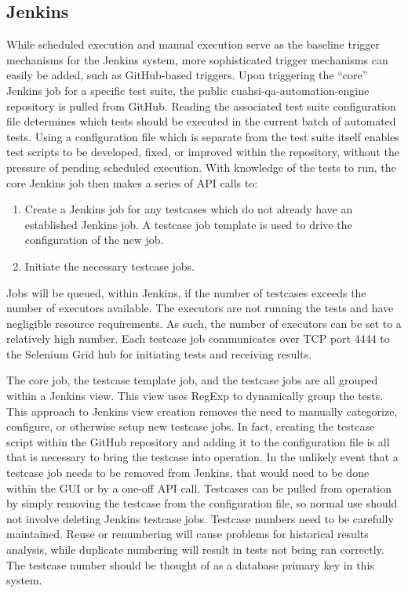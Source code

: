 \documentclass[10pt]{article}
\begin{document}
\subsection{Jenkins}
While scheduled execution and manual execution serve as the baseline trigger mechanisms for the Jenkins system, more sophisticated trigger mechanisms can easily be added, such as GitHub-based triggers.  Upon triggering the ``core'' Jenkins job for a specific test suite, the public cuahsi-qa-automation-engine repository is pulled from GitHub.  Reading the associated test suite configuration file determines which tests should be executed in the current batch of automated tests.  Using a configuration file which is separate from the test suite itself enables test scripts to be developed, fixed, or improved within the repository, without the pressure of pending scheduled execution.  With knowledge of the tests to run, the core Jenkins job then makes a series of API calls to:
\begin{enumerate}
\item Create a Jenkins job for any testcases which do not already have an established Jenkins job.  A testcase job template is used to drive the configuration of the new job.
\item Initiate the necessary testcase jobs.  
\end{enumerate}
Jobs will be queued, within Jenkins, if the number of testcases exceeds the number of executors available.  The executors are not running the tests and have negligible resource requirements.  As such, the number of executors can be set to a relatively high number.  Each testcase job communicates over TCP port 4444 to the Selenium Grid hub for initiating tests and receiving results.

The core job, the testcase template job, and the testcase jobs are all grouped within a Jenkins view.  This view uses RegExp to dynamically group the tests.  This approach to Jenkins view creation removes the need to manually categorize, configure, or otherwise setup new testcase jobs.  In fact, creating the testcase script within the GitHub repository and adding it to the configuration file is all that is necessary to bring the testcase into operation.  In the unlikely event that a testcase job needs to be removed from Jenkins, that would need to be done within the GUI or by a one-off API call.  Testcases can be pulled from operation by simply removing the testcase from the configuration file, so normal use should not involve deleting Jenkins testcase jobs.  Testcase numbers need to be carefully maintained.  Reuse or renumbering will cause problems for historical results analysis, while duplicate numbering will result in tests not being ran correctly.  The testcase number should be thought of as a database primary key in this system.
\end{document}

